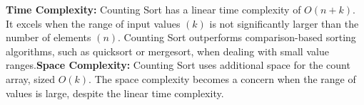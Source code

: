 \documentclass[preview]{standalone}
\begin{document}
\begin{center}
\textbf{Time Complexity:} Counting Sort has a linear time complexity of $O(n + k)$. It excels when the range of input values $(k)$ is not significantly larger than the number of elements $(n)$. Counting Sort outperforms comparison-based sorting algorithms, such as quicksort or mergesort, when dealing with small value ranges.\textbf{Space Complexity:} Counting Sort uses additional space for the count array, sized $O(k)$. The space complexity becomes a concern when the range of values is large, despite the linear time complexity.
\end{center}
\end{document}
